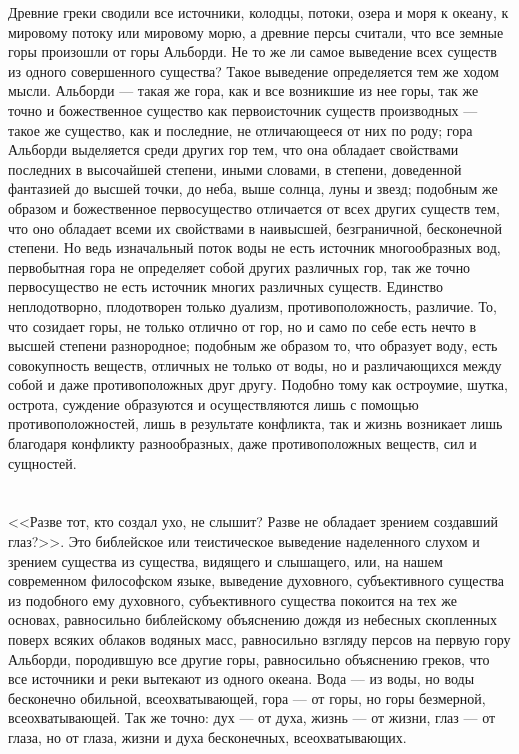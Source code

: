 \documentclass[12pt,oneside]{book}
\begin{document}
Древние греки сводили все источники, колодцы, потоки, озера и моря к океану, к мировому потоку или мировому морю, а древние персы считали, что все земные горы произошли от горы Альборди. Не то же ли самое выведение всех существ из одного совершенного существа? Такое выведение определяется тем же ходом мысли. Альборди --- такая же гора, как и все возникшие из нее горы, так же точно и божественное существо как первоисточник существ производных --- такое же существо, как и последние, не отличающееся от них по роду; гора Альборди выделяется среди других гор тем, что она обладает свойствами последних в высочайшей степени, иными словами, в степени, доведенной фантазией до высшей точки, до неба, выше солнца, луны и звезд; подобным же образом и божественное первосущество отличается от всех других существ тем, что оно обладает всеми их свойствами в наивысшей, безграничной, бесконечной степени. Но ведь изначальный поток воды не есть источник многообразных вод, первобытная гора не определяет собой других различных гор, так же точно первосущество не есть источник многих различных существ. Единство неплодотворно, плодотворен только дуализм, противоположность, различие. То, что созидает горы, не только отлично от гор, но и само по себе есть нечто в высшей степени разнородное; подобным же образом то, что образует воду, есть совокупность веществ, отличных не только от воды, но и различающихся между собой и даже противоположных друг другу. Подобно тому как остроумие, шутка, острота, суждение образуются и осуществляются лишь с помощью противоположностей, лишь в результате конфликта, так и жизнь возникает лишь благодаря конфликту разнообразных, даже противоположных веществ, сил и сущностей.



\chapter{}

<<Разве тот, кто создал ухо, не слышит? Разве не обладает зрением создавший глаз?>>. Это библейское или теистическое выведение наделенного слухом и зрением существа из существа, видящего и слышащего, или, на нашем современном философском языке, выведение духовного, субъективного существа из подобного ему духовного, субъективного существа покоится на тех же основах, равносильно библейскому объяснению дождя из небесных скопленных поверх всяких облаков водяных масс, равносильно взгляду персов на первую гору Альборди, породившую все другие горы, равносильно объяснению греков, что все источники и реки вытекают из одного океана. Вода --- из воды, но воды бесконечно обильной, всеохватывающей, гора --- от горы, но горы безмерной, всеохватывающей. Так же точно: дух --- от духа, жизнь --- от жизни, глаз --- от глаза, но от глаза, жизни и духа бесконечных, всеохватывающих.
\end{document}
